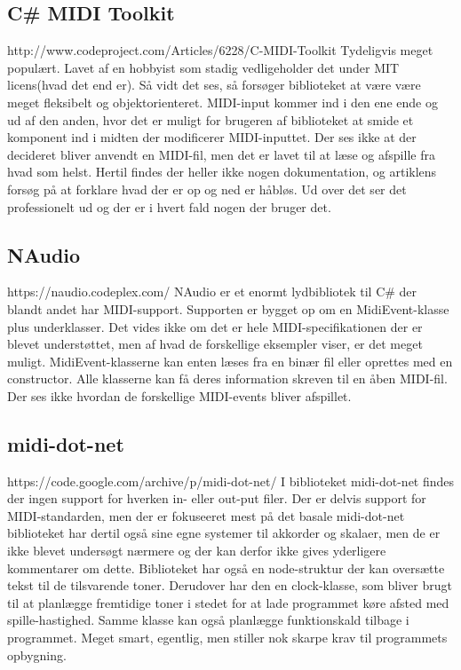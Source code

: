 \subsection{C# MIDI Toolkit}
http://www.codeproject.com/Articles/6228/C-MIDI-Toolkit
Tydeligvis meget populært. Lavet af en hobbyist som stadig vedligeholder det under MIT licens(hvad det end er).
Så vidt det ses, så forsøger biblioteket at være være meget fleksibelt og objektorienteret.  MIDI-input kommer ind i den ene ende og ud af den anden, hvor det er muligt for brugeren af biblioteket at smide et komponent ind i midten der modificerer MIDI-inputtet. Der ses ikke at der decideret bliver anvendt en MIDI-fil, men det er lavet til at læse og afspille fra hvad som helst.
Hertil findes der heller ikke nogen dokumentation, og artiklens forsøg på at forklare hvad der er op og ned er håbløs. Ud over det ser det professionelt ud og der er i hvert fald nogen der bruger det.

\subsection{NAudio}
https://naudio.codeplex.com/
NAudio er et enormt lydbibliotek til C# der blandt andet har MIDI-support. Supporten er bygget op om en MidiEvent-klasse plus underklasser. Det vides ikke om det er hele MIDI-specifikationen der er blevet understøttet, men af hvad de forskellige eksempler viser, er det meget muligt.
MidiEvent-klasserne kan enten læses fra en binær fil eller oprettes med en constructor. Alle klasserne kan få deres information skreven til en åben MIDI-fil.
Der ses ikke hvordan de forskellige MIDI-events bliver afspillet.
\subsection{midi-dot-net}
https://code.google.com/archive/p/midi-dot-net/
I biblioteket midi-dot-net findes der ingen support for hverken in- eller out-put filer. Der er delvis support for MIDI-standarden, men der er fokuseeret mest på det basale
midi-dot-net biblioteket har dertil også sine egne systemer til akkorder og skalaer, men de er ikke blevet undersøgt nærmere og der kan derfor ikke gives yderligere kommentarer om dette. Biblioteket  har også en node-struktur der kan oversætte tekst til de tilsvarende toner. 
Derudover har den en clock-klasse, som bliver brugt til at planlægge fremtidige toner i stedet for at lade programmet køre afsted med spille-hastighed. Samme klasse kan også planlægge funktionskald tilbage i programmet. Meget smart, egentlig, men stiller nok skarpe  krav til programmets opbygning.
